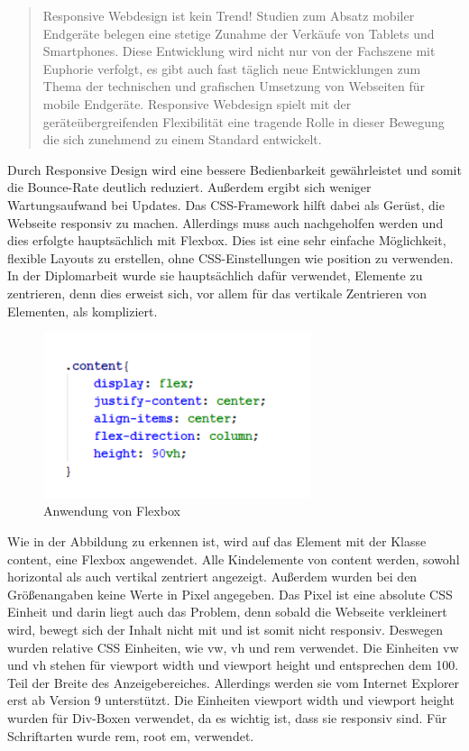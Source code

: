 \begin{quote}
Responsive Webdesign ist kein Trend! Studien zum Absatz mobiler Endgeräte belegen eine stetige Zunahme der Verkäufe von Tablets und Smartphones. Diese Entwicklung wird nicht nur von der Fachszene mit Euphorie verfolgt, es gibt auch fast täglich neue Entwicklungen zum Thema der technischen und grafischen Umsetzung von Webseiten für mobile Endgeräte. Responsive Webdesign spielt mit der geräteübergreifenden Flexibilität eine tragende Rolle in dieser Bewegung die sich zunehmend zu einem Standard entwickelt. 
\end{quote}

Durch Responsive Design wird eine bessere Bedienbarkeit gewährleistet und somit die Bounce-Rate deutlich reduziert. Außerdem ergibt sich weniger Wartungsaufwand bei Updates.  Das CSS-Framework hilft dabei als Gerüst, die Webseite responsiv zu machen. Allerdings muss auch nachgeholfen werden und dies erfolgte hauptsächlich mit Flexbox. Dies ist eine sehr einfache Möglichkeit, flexible Layouts zu erstellen, ohne CSS-Einstellungen wie position zu verwenden. In der Diplomarbeit wurde sie hauptsächlich dafür verwendet, Elemente zu zentrieren, denn dies erweist sich, vor allem für das vertikale Zentrieren von Elementen, als kompliziert. 

\begin{figure}[H] 
  \centering
     \includegraphics[width=0.7\textwidth]{webseite_abb2.png}
  \caption{Anwendung von Flexbox}

\end{figure}

Wie in der Abbildung zu erkennen ist, wird auf das Element mit der Klasse content, eine Flexbox angewendet. Alle Kindelemente von content werden, sowohl horizontal als auch vertikal zentriert angezeigt. Außerdem wurden bei den Größenangaben keine Werte in Pixel angegeben. Das Pixel ist eine absolute CSS Einheit und darin liegt auch das Problem, denn sobald die Webseite verkleinert wird, bewegt sich der Inhalt nicht mit und ist somit nicht responsiv. Deswegen wurden relative CSS Einheiten, wie vw, vh und rem verwendet. Die Einheiten vw und vh stehen für viewport width und viewport height und entsprechen dem 100. Teil der Breite des Anzeigebereiches. Allerdings werden sie vom Internet Explorer erst ab Version 9 unterstützt. Die Einheiten viewport width und viewport height wurden für Div-Boxen verwendet, da es wichtig ist, dass sie responsiv sind.  Für Schriftarten wurde rem, root em, verwendet. 

